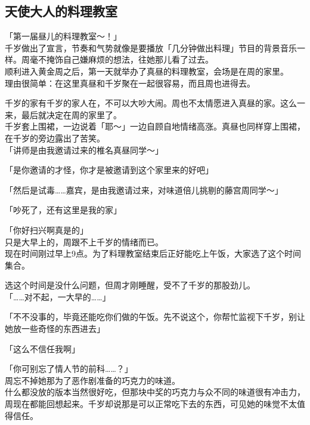 \subsection{天使大人的料理教室}

「第一届昼儿的料理教室～！」\\

千岁做出了宣言，节奏和气势就像是要播放「几分钟做出料理」节目的背景音乐一样。周毫不掩饰自己嫌麻烦的想法，往她那儿看了过去。\\

顺利进入黄金周之后，第一天就举办了真昼的料理教室，会场是在周的家里。\\

理由很简单：在这里真昼和千岁聚在一起很容易，而且周也进得去。

千岁的家有千岁的家人在，不可以大吵大闹。周也不太情愿进入真昼的家。这么一来，最后就决定在周的家里了。\\

千岁套上围裙，一边说着「耶～」一边自顾自地情绪高涨。真昼也同样穿上围裙，在千岁的旁边露出了苦笑。\\

「讲师是由我邀请过来的椎名真昼同学～」

「是你邀请的才怪，你才是被邀请到这个家里来的好吧」

「然后是试毒……嘉宾，是由我邀请过来，对味道倍儿挑剔的藤宫周同学～」

「吵死了，还有这里是我的家」

「你好扫兴啊真是的」\\

只是大早上的，周跟不上千岁的情绪而已。\\

现在时间刚过早上9点。为了料理教室结束后正好能吃上午饭，大家选了这个时间集合。

选这个时间是没什么问题，但周才刚睡醒，受不了千岁的那股劲儿。\\

「……对不起，一大早的……」

「不不没事的，毕竟还能吃你们做的午饭。先不说这个，你帮忙监视下千岁，别让她放一些奇怪的东西进去」

「这么不信任我啊」

「你可别忘了情人节的前科……？」\\

周忘不掉她那为了恶作剧准备的巧克力的味道。\\

什么都没放的版本当然很好吃，但那块中奖的巧克力与众不同的味道很有冲击力，周现在都能回想起来。千岁却说那是可以正常吃下去的东西，可见她的味觉不太值得信任。\\

